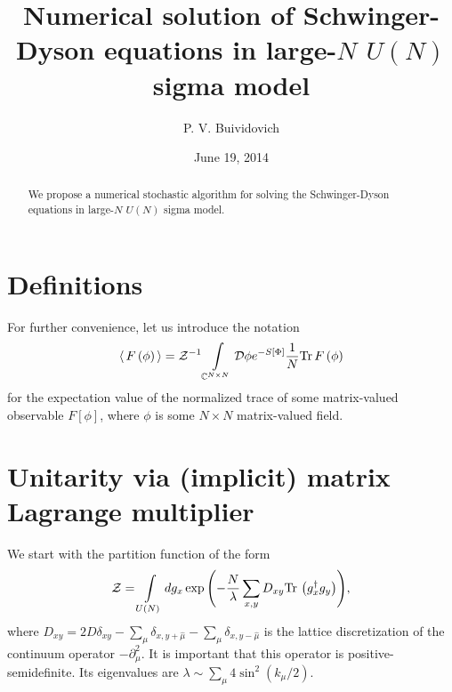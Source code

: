\documentclass[twocolumn,showpacs,preprintnumbers,superscriptaddress,amsmath,floatfix,amssymb,secnumarabic]{revtex4}
\newcommand{\lr}[1]{ \left( #1 \right) }
\newcommand{\lrs}[1]{ \left[ #1 \right] }
\newcommand{\vev}[1]{ \langle \, #1 \, \rangle }
\newcommand{\tr}{ {\rm Tr} \, }
\newcommand{\expa}[1]{ \exp{\left( #1 \right)} }
\newcommand{\logo}{\\ \vskip -18mm
\leftline{\texttt{[image: logo.eps]}} \vskip 10mm}
\begin{document}
\sloppy

\title{Numerical solution of Schwinger-Dyson equations in large-$N$ $U\lr{N}$ sigma model}

\author{P. V. Buividovich}

\date{June 19, 2014}
\begin{abstract}
 We propose a numerical stochastic algorithm for solving the Schwinger-Dyson equations in large-$N$ $U\lr{N}$ sigma model.
\end{abstract}

\maketitle

\section*{Definitions}

For further convenience, let us introduce the notation
\begin{eqnarray}
\label{vev_definition}
 \vev{F\lr{\phi}} = \mathcal{Z}^{-1} \int\limits_{\mathbb{C}^{N \times N}} \mathcal{D}\phi e^{-S\lrs{\Phi}} \frac{1}{N} \tr F\lr{\phi}
\end{eqnarray}
for the expectation value of the normalized trace of some matrix-valued observable $F\lrs{\phi}$, where $\phi$ is some $N \times N$ matrix-valued field.

\section*{Unitarity via (implicit) matrix Lagrange multiplier}

 We start with the partition function of the form
\begin{eqnarray}
\label{sm_partition}
 \mathcal{Z} = \int\limits_{U\lr{N}} dg_x \expa{-\frac{N}{\lambda} \sum\limits_{x,y} D_{xy} \tr\lr{g^{\dag}_x g_y} } ,
\end{eqnarray}
where $D_{xy} = 2 D \delta_{x y} - \sum\limits_{\mu} \delta_{x,y+\hat{\mu}} - \sum\limits_{\mu} \delta_{x,y-\hat{\mu}}$ is the lattice discretization of the continuum operator $-\partial_{\mu}^2$. It is important that this operator is positive-semidefinite. Its eigenvalues are $\lambda \sim \sum\limits_{\mu} 4 \sin^2\lr{k_{\mu}/2}$.
\end{document}
